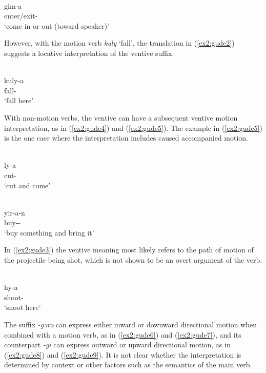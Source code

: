 \ea\label{ex2:gude1}
 \\
\gll gim-a	\\
enter/exit-		\\
\glt `come in or out (toward speaker)'
\z 

However, with the motion verb \textit{kuly} `fall', the translation in (\ref{ex2:gude2}) suggests a locative interpretation of the ventive suffix.

\ea\label{ex2:gude2}
 \\
\gll kuly-a \\
fall- \\
\glt `fall here'
\z 

With non-motion verbs, the ventive can have a subsequent ventive motion interpretation, as in (\ref{ex2:gude4}) and (\ref{ex2:gude5}). The example in (\ref{ex2:gude5}) is the one case where the interpretation includes caused accompanied motion.

\ea\label{ex2:gude4}
 \\
\gll ly-a \\
cut- \\
\glt `cut and come'

\ex\label{ex2:gude5}
 \\
\gll yir-a-n \\
buy-- \\
\glt `buy something and bring it'
\z

In (\ref{ex2:gude3}) the ventive meaning most likely refers to the path of motion of the projectile being shot, which is not shown to be an overt argument of the verb.

\ea\label{ex2:gude3}
 \\
\gll hy-a	\\
shoot-	\\
\glt `shoot here'
\z 

The suffix \textit{-gərə} can express either inward or downward directional motion when combined with a motion verb, as in (\ref{ex2:gude6}) and (\ref{ex2:gude7}), and its counterpart \textit{-gi} can express outward or upward directional motion, as in (\ref{ex2:gude8}) and (\ref{ex2:gude9}). It is not clear whether the interpretation is determined by context or other factors such as the semantics of the main verb.

